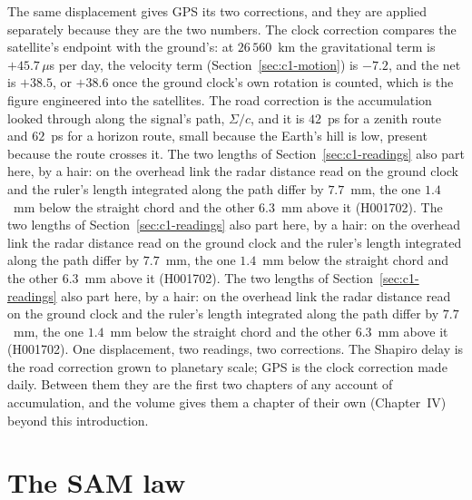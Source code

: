 The same displacement gives GPS its two corrections, and they are applied separately because they are the two numbers. The clock correction compares the satellite's endpoint with the ground's: at $26\,560$~km the gravitational term is $+45.7\,\mu$s per day, the velocity term (Section~\ref{sec:c1-motion}) is $-7.2$, and the net is $+38.5$, or $+38.6$ once the ground clock's own rotation is counted, which is the figure engineered into the satellites. The road correction is the accumulation looked through along the signal's path, $\Sigma/c$, and it is $42$~ps for a zenith route and $62$~ps for a horizon route, small because the Earth's hill is low, present because the route crosses it. The two lengths of Section~\ref{sec:c1-readings} also part here, by a hair: on the overhead link the radar distance read on the ground clock and the ruler's length integrated along the path differ by $7.7$~mm, the one $1.4$~mm below the straight chord and the other $6.3$~mm above it (H001702). The two lengths of Section~\ref{sec:c1-readings} also part here, by a hair: on the overhead link the radar distance read on the ground clock and the ruler's length integrated along the path differ by $7.7$~mm, the one $1.4$~mm below the straight chord and the other $6.3$~mm above it (H001702). The two lengths of Section~\ref{sec:c1-readings} also part here, by a hair: on the overhead link the radar distance read on the ground clock and the ruler's length integrated along the path differ by $7.7$~mm, the one $1.4$~mm below the straight chord and the other $6.3$~mm above it (H001702). One displacement, two readings, two corrections. The Shapiro delay is the road correction grown to planetary scale; GPS is the clock correction made daily. Between them they are the first two chapters of any account of accumulation, and the volume gives them a chapter of their own (Chapter~IV) beyond this introduction.

\section{The SAM law}
\label{sec:c1-law}

